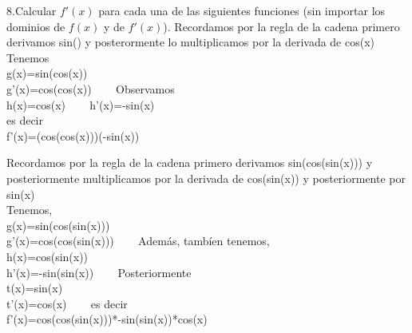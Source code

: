 \documentclass[12pt]{article}
\begin{document}
\vfill

8.Calcular $f'(x)$ para cada una de las siguientes funciones (sin importar los dominios de $f(x)$ y de $f'(x)$).
        Recordamos por la regla de la cadena primero derivamos sin() y posterormente lo multiplicamos por la derivada de cos(x)\\
        Tenemos\\
        g(x)=sin(cos(x))\\
        g'(x)=cos(cos(x)) \ \ \  %
        Observamos\\
        h(x)=cos(x)  \ \ \ %
        h'(x)=-sin(x)\\
        es decir\\
        f'(x)=(cos(cos(x)))(-sin(x)) \ \ \ %



        Recordamos por la regla de la cadena primero derivamos sin(cos(sin(x))) y posteriormente multiplicamos por la derivada de cos(sin(x)) y posteriormente por sin(x) \\
        Tenemos,\\
        g(x)=sin(cos(sin(x)))\\
        g'(x)=cos(cos(sin(x))) \ \ \ %
        Además, tambíen tenemos,\\
        h(x)=cos(sin(x))\\
        h'(x)=-sin(sin(x)) \ \ \ %
        Posteriormente\\
        t(x)=sin(x)\\
        t'(x)=cos(x) \ \ \ %
        es decir\\
        f'(x)=cos(cos(sin(x)))*-sin(sin(x))*cos(x) \ \ \ %
\end{document}
